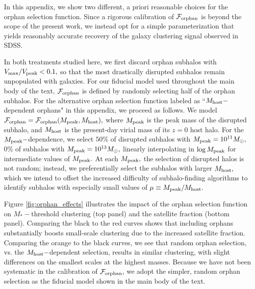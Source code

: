 \documentclass[usenatbib,usegraphicx,letterpaper]{mn2e}
\newcommand{\mstar}{M_{\ast}}
\newcommand{\mpeak}{M_{\rm peak}}
\newcommand{\mhost}{M_{\rm host}}
\newcommand{\msun}{M_\odot}
\begin{document}
In this appendix, we show two different, a priori reasonable choices for the orphan selection function. Since a rigorous calibration of $\mathcal{F}_{\rm orphan}$ is beyond the scope of the present work, we instead opt for a simple parameterization that yields reasonably accurate recovery of the galaxy clustering signal observed in SDSS.

In both treatments studied here, we first discard orphan subhalos with $V_{\rm max}/V_{\rm peak}<0.1,$ so that the most drastically disrupted subhalos remain unpopulated with galaxies. For our fiducial model used throughout the main body of the text, $\mathcal{F}_{\rm orphan}$ is defined by randomly selecting half of the orphan subhalos. For the alternative orphan selection function labeled as ``$M_{\rm host}-$dependent orphans" in this appendix, we proceed as follows. We model $\mathcal{F}_{\rm orphan}=\mathcal{F}_{\rm orphan}(M_{\rm peak},M_{\rm host}),$ where $\mpeak$ is the peak mass of the disrupted subhalo, and $\mhost$ is the present-day virial mass of its $z=0$ host halo. For the $\mpeak-$dependence, we select $50\%$ of disrupted subhalos with $\mpeak=10^{11}\msun,$ $0\%$ of subhalos with $\mpeak=10^{13}\msun,$ linearly interpolating in $\log\mpeak$ for intermediate values of $\mpeak.$ At each $\mpeak,$ the selection of disrupted halos is not random; instead, we preferentially select the subhalos with larger $\mhost,$ which we intend to offset the increased difficulty of subhalo-finding algorithms to identify subhalos with especially small values of  $\mu\equiv\mpeak/\mhost.$

Figure \ref{fig:orphan_effects} illustrates the impact of the orphan selection function on $\mstar-$threshold clustering (top panel) and the satellite fraction (bottom panel). Comparing the black to the red curves shows that including orphans substantially boosts small-scale clustering due to the increased satellite fraction. Comparing the orange to the black curves, we see that random orphan selection, vs. the $M_{\rm host}-$dependent selection, results in similar clustering, with slight differences on the smallest scales at the highest masses. Because we have not been systematic in the calibration of $\mathcal{F}_{\rm orphan},$ we adopt the simpler, random orphan selection as the fiducial model shown in the main body of the text.
\end{document}

